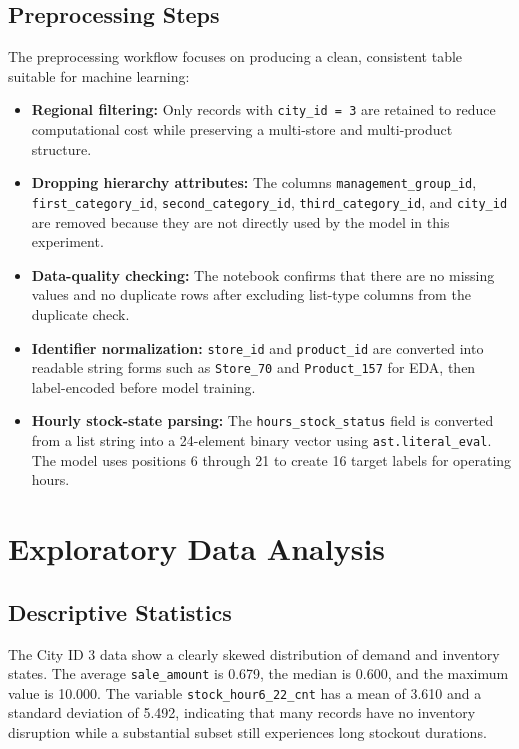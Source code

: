 \documentclass{llncs}
\begin{document}
\subsection{Preprocessing Steps}
The preprocessing workflow focuses on producing a clean, consistent table suitable for machine learning:
\begin{itemize}
    \item \textbf{Regional filtering:} Only records with \texttt{city\_id = 3} are retained to reduce computational cost while preserving a multi-store and multi-product structure.
    \item \textbf{Dropping hierarchy attributes:} The columns \texttt{management\_group\_id}, \texttt{first\_category\_id}, \texttt{second\_category\_id}, \texttt{third\_category\_id}, and \texttt{city\_id} are removed because they are not directly used by the model in this experiment.
    \item \textbf{Data-quality checking:} The notebook confirms that there are no missing values and no duplicate rows after excluding list-type columns from the duplicate check.
    \item \textbf{Identifier normalization:} \texttt{store\_id} and \texttt{product\_id} are converted into readable string forms such as \texttt{Store\_70} and \texttt{Product\_157} for EDA, then label-encoded before model training.
    \item \textbf{Hourly stock-state parsing:} The \texttt{hours\_stock\_status} field is converted from a list string into a 24-element binary vector using \texttt{ast.literal\_eval}. The model uses positions 6 through 21 to create 16 target labels for operating hours.
\end{itemize}

\section{Exploratory Data Analysis}

\subsection{Descriptive Statistics}
The City ID 3 data show a clearly skewed distribution of demand and inventory states. The average \texttt{sale\_amount} is 0.679, the median is 0.600, and the maximum value is 10.000. The variable \texttt{stock\_hour6\_22\_cnt} has a mean of 3.610 and a standard deviation of 5.492, indicating that many records have no inventory disruption while a substantial subset still experiences long stockout durations.
\end{document}
